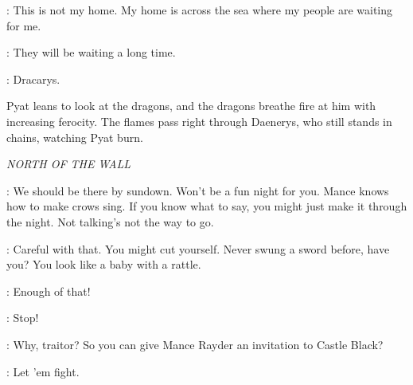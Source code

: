 \DAENERYS: This is not my home. My home is across the sea where my people are waiting for me. 

\PYAT: They will be waiting a long time. 


\DAENERYS:  Dracarys. 

\n Pyat leans to look at the dragons, and the dragons breathe fire at him with increasing ferocity. The flames pass right through Daenerys, who still stands in chains, watching Pyat burn.



\scene

\textit{NORTH OF THE WALL} 


\YGRITTE: We should be there by sundown. Won't be a fun night for you. Mance knows how to make crows sing. If you know what to say, you might just make it through the night.  Not talking's not the way to go. 


\JON: Careful with that. You might cut yourself. Never swung a sword before, have you? You look like a baby with a rattle. 


\HALFHAND: Enough of that! 


\JON: Stop! 

\HALFHAND:  Why, traitor? So you can give Mance Rayder an invitation to Castle Black? 


\LORDOFBONES: Let 'em fight. 


